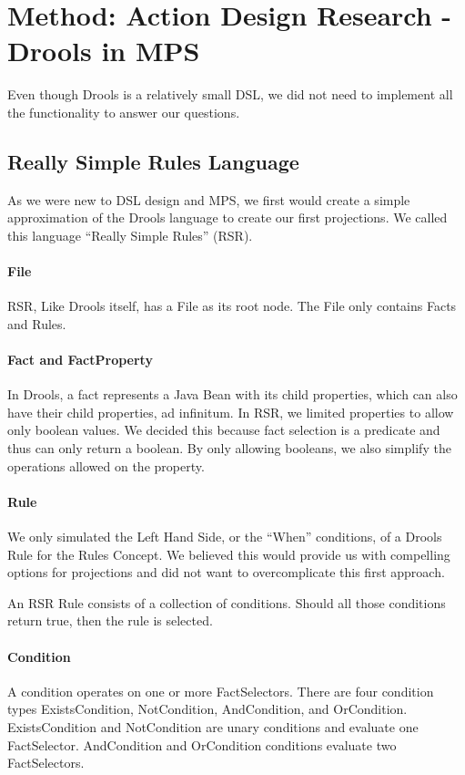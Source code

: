\section{Method: Action Design Research - Drools in MPS}\label{section:Method_action_research}

Even though Drools is a relatively small DSL, we did not need to implement all the functionality to answer our questions.

\subsection{Really Simple Rules Language}
As we were new to DSL design and MPS, we first would create a simple approximation of the Drools language to create our first projections.
We called this language ``Really Simple Rules'' (RSR).

\paragraph{File} RSR, Like Drools itself, has a File as its root node.
The File only contains Facts and Rules.

\paragraph{Fact and FactProperty} In Drools, a fact represents a Java Bean with its child properties, which can also have their child properties, ad infinitum.
In RSR, we limited properties to allow only boolean values.
We decided this because fact selection is a predicate and thus can only return a boolean.
By only allowing booleans, we also simplify the operations allowed on the property.

\paragraph{Rule} We only simulated the Left Hand Side, or the ``When'' conditions, of a Drools Rule for the Rules Concept.
We believed this would provide us with compelling options for projections and did not want to overcomplicate this first approach.

An RSR Rule consists of a collection of conditions.
Should all those conditions return true, then the rule is selected.

\paragraph{Condition} A condition operates on one or more FactSelectors.
There are four condition types ExistsCondition, NotCondition, AndCondition, and OrCondition.
ExistsCondition and NotCondition are unary conditions and evaluate one FactSelector.
AndCondition and OrCondition conditions evaluate two FactSelectors.

